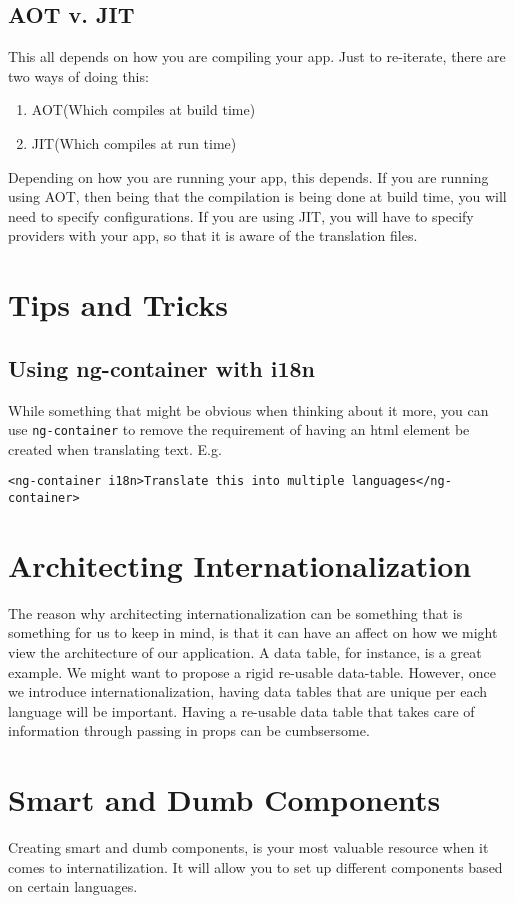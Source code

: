 \subsection{AOT v. JIT}
This all depends on how you are compiling your app. Just to re-iterate, there
are two ways of doing this:
\begin{enumerate}
  \item AOT(Which compiles at build time)
  \item JIT(Which compiles at run time)
\end{enumerate}

Depending on how you are running your app, this depends. If you are running 
using AOT, then being that the compilation is being done at build time, you 
will need to specify configurations. If you are using JIT, you will have to 
specify providers with your app, so that it is aware of the translation 
files.

\section{Tips and Tricks}
\subsection{Using ng-container with i18n}
While something that might be obvious when thinking about it more, you can use 
\lstinline{ng-container} to remove the requirement of having an html element 
be created when translating text. E.g. 
\begin{lstlisting}
<ng-container i18n>Translate this into multiple languages</ng-container>
\end{lstlisting}

\section{ Architecting Internationalization }
The reason why architecting internationalization can be something that is
something for us to keep in mind, is that it can have an affect on how we might
view the architecture of our application. A data table, for instance, is a great
example. We might want to propose a rigid re-usable data-table. However, once
we introduce internationalization, having data tables that are unique per each
language will be important. Having a re-usable data table that takes care of
information through passing in props can be cumbsersome.

\section{ Smart and Dumb Components }
Creating smart and dumb components, is your most valuable resource when it comes
to internatilization. It will allow you to set up different components based on
certain languages. 
